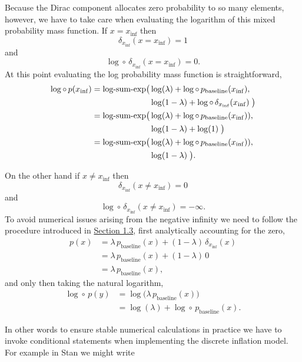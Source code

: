 \documentclass[
  letterpaper,
  DIV=11,
  numbers=noendperiod]{scrartcl}
\begin{document}
Because the Dirac component allocates zero probability to so many
elements, however, we have to take care when evaluating the logarithm of
this mixed probability mass function. If \(x = x_{\mathrm{inf}}\) then
\[
\delta_{x_{\mathrm{inf}}}(x = x_{\mathrm{inf}}) = 1
\] and \[
\log \circ \, \delta_{x_{\mathrm{inf}}} (x = x_{\mathrm{inf}}) = 0.
\] At this point evaluating the log probability mass function is
straightforward, \begin{align*}
\log \circ \, p (x_{\mathrm{inf}})
&=
\text{log-sum-exp}\big(
  \log(\lambda)
+ \log \circ \, p_{\mathrm{baseline}} (x_{\mathrm{inf}}),
\\
&
\hphantom{=\text{log-sum-exp}\big(\;}
  \log(1 - \lambda)
+ \log \circ \, \delta_{x_{\mathrm{inf}}} (x_{\mathrm{inf}}) \; \big)
\\
&=
\text{log-sum-exp}\big(
  \log(\lambda)
+ \log \circ \, p_{\mathrm{baseline}} (x_{\mathrm{inf}}) ),
\\
&
\hphantom{=\text{log-sum-exp}\big(\;}
 \log(1 - \lambda)  + \log(1) \; \big)
\\
&=
\text{log-sum-exp}\big(
  \log(\lambda)
+ \log \circ \, p_{\mathrm{baseline}} (x_{\mathrm{inf}}) ),
\\
&
\hphantom{=\text{log-sum-exp}\big(\;}
\log(1 - \lambda) \; \big).
\end{align*}

On the other hand if \(x \ne x_{\mathrm{inf}}\) then \[
\delta_{x_{\mathrm{inf}}}(x \ne x_{\mathrm{inf}}) = 0
\] and \[
\log \circ \, \delta_{x_{\mathrm{inf}}} (x \ne x_{\mathrm{inf}}) = -\infty.
\] To avoid numerical issues arising from the negative infinity we need
to follow the procedure introduced in \hyperref[sec:stable_impl]{Section
1.3}, first analytically accounting for the zero, \begin{align*}
p(x)
&=
  \lambda \, p_{\mathrm{baseline}}(x)
+ (1 - \lambda) \, \delta_{x_{\mathrm{inf}}}(x)
\\
&=
\lambda \, p_{\mathrm{baseline}}(x) + (1 - \lambda) \, 0
\\
&=
\lambda \, p_{\mathrm{baseline}}(x),
\end{align*} and only then taking the natural logarithm, \begin{align*}
\log \circ \, p (y)
&=
\log \big( \lambda \, p_{\mathrm{baseline}}(x) \big)
\\
&=
\log (\lambda) + \log \circ \, p_{\mathrm{baseline}} (x).
\end{align*}

In other words to ensure stable numerical calculations in practice we
have to invoke conditional statements when implementing the discrete
inflation model. For example in Stan we might write
\end{document}
